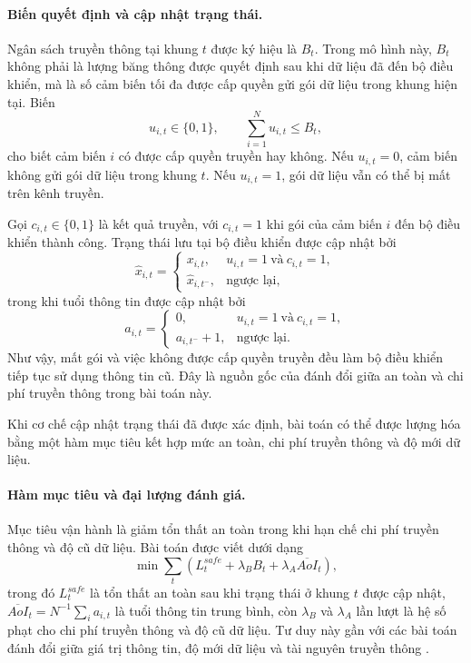 \documentclass[10pt]{article}
\begin{document}
\paragraph{Biến quyết định và cập nhật trạng thái.}
Ngân sách truyền thông tại khung $t$ được ký hiệu là $B_t$. Trong mô hình này, $B_t$ không phải là lượng băng thông được quyết định sau khi dữ liệu đã đến bộ điều khiển, mà là số cảm biến tối đa được cấp quyền gửi gói dữ liệu trong khung hiện tại. Biến
\begin{equation}
u_{i,t}\in\{0,1\},\qquad \sum_{i=1}^{N}u_{i,t}\le B_t,
\end{equation}
cho biết cảm biến $i$ có được cấp quyền truyền hay không. Nếu $u_{i,t}=0$, cảm biến không gửi gói dữ liệu trong khung $t$. Nếu $u_{i,t}=1$, gói dữ liệu vẫn có thể bị mất trên kênh truyền.

Gọi $c_{i,t}\in\{0,1\}$ là kết quả truyền, với $c_{i,t}=1$ khi gói của cảm biến $i$ đến bộ điều khiển thành công. Trạng thái lưu tại bộ điều khiển được cập nhật bởi
\begin{equation}
\hat{x}_{i,t}=\begin{cases}
x_{i,t}, & u_{i,t}=1\ \text{và}\ c_{i,t}=1,\\
\hat{x}_{i,t^-}, & \text{ngược lại},
\end{cases}
\end{equation}
trong khi tuổi thông tin được cập nhật bởi
\begin{equation}
a_{i,t}=\begin{cases}
0, & u_{i,t}=1\ \text{và}\ c_{i,t}=1,\\
a_{i,t^-}+1, & \text{ngược lại}.
\end{cases}
\end{equation}
Như vậy, mất gói và việc không được cấp quyền truyền đều làm bộ điều khiển tiếp tục sử dụng thông tin cũ. Đây là nguồn gốc của đánh đổi giữa an toàn và chi phí truyền thông trong bài toán này.

Khi cơ chế cập nhật trạng thái đã được xác định, bài toán có thể được lượng hóa bằng một hàm mục tiêu kết hợp mức an toàn, chi phí truyền thông và độ mới dữ liệu.

\paragraph{Hàm mục tiêu và đại lượng đánh giá.}
Mục tiêu vận hành là giảm tổn thất an toàn trong khi hạn chế chi phí truyền thông và độ cũ dữ liệu. Bài toán được viết dưới dạng
\begin{equation}
\min \sum_t \left(L^{safe}_t + \lambda_B B_t + \lambda_A \overline{AoI}_t\right),
\end{equation}
trong đó $L^{safe}_t$ là tổn thất an toàn sau khi trạng thái ở khung $t$ được cập nhật, $\overline{AoI}_t=N^{-1}\sum_i a_{i,t}$ là tuổi thông tin trung bình, còn $\lambda_B$ và $\lambda_A$ lần lượt là hệ số phạt cho chi phí truyền thông và độ cũ dữ liệu. Tư duy này gần với các bài toán đánh đổi giữa giá trị thông tin, độ mới dữ liệu và tài nguyên truyền thông \cite{ayan2019aoi,wang2021voi,molin2019voi}.
\end{document}
